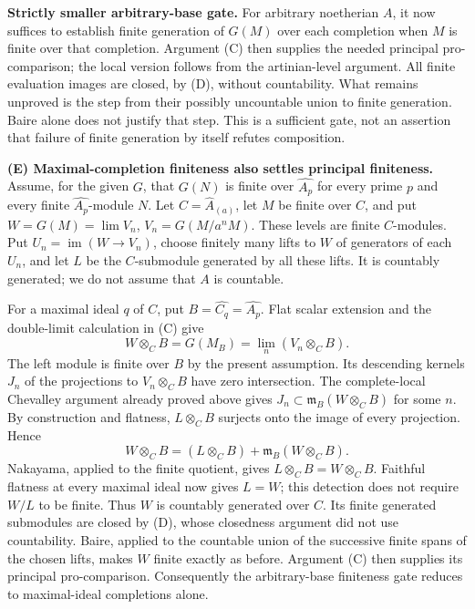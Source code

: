 \textbf{Strictly smaller arbitrary-base gate.}
For arbitrary noetherian $A$, it now suffices to establish finite
generation of $G(M)$ over each completion when $M$ is finite over that
completion. Argument (C) then supplies the needed principal
pro-comparison; the local version follows from the artinian-level
argument. All finite evaluation images are closed, by (D), without
countability. What remains unproved is the step from their possibly
uncountable union to finite generation. Baire alone does not justify
that step. This is a sufficient gate, not an assertion that failure
of finite generation by itself refutes composition.


\textbf{(E) Maximal-completion finiteness also settles principal finiteness.}
Assume, for the given $G$, that $G(N)$ is finite over $\widehat{A_p}$
for every prime $p$ and every finite $\widehat{A_p}$-module $N$.
Let $C=\widehat A_{(a)}$, let $M$ be finite over $C$, and put
$W=G(M)=\lim V_n$, $V_n=G(M/a^nM)$. These levels are finite
$C$-modules. Put $U_n=\operatorname{im}(W\to V_n)$, choose finitely
many lifts to $W$ of generators of each $U_n$, and let $L$ be the
$C$-submodule generated by all these lifts. It is countably generated;
we do not assume that $A$ is countable.

For a maximal ideal $q$ of $C$, put $B=\widehat{C_q}=\widehat{A_p}$.
Flat scalar extension and the double-limit calculation in (C) give
\[
 W\otimes_C B=G(M_B)=\lim_n(V_n\otimes_C B).
\]
The left module is finite over $B$ by the present assumption. Its
descending kernels $J_n$ of the projections to $V_n\otimes_C B$
have zero intersection. The complete-local Chevalley argument already
proved above gives $J_n\subset\mathfrak m_B(W\otimes_C B)$ for
some $n$. By construction and flatness, $L\otimes_C B$ surjects
onto the image of every projection. Hence
\[
 W\otimes_C B=(L\otimes_C B)+\mathfrak m_B(W\otimes_C B).
\]
Nakayama, applied to the finite quotient, gives $L\otimes_C B=W\otimes_C B$.
Faithful flatness at every maximal ideal now gives $L=W$; this detection
does not require $W/L$ to be finite. Thus $W$ is countably generated
over $C$. Its finite generated submodules are closed by (D), whose
closedness argument did not use countability. Baire, applied to the
countable union of the successive finite spans of the chosen lifts,
makes $W$ finite exactly as before. Argument (C) then supplies its
principal pro-comparison. Consequently the arbitrary-base finiteness
gate reduces to maximal-ideal completions alone.

